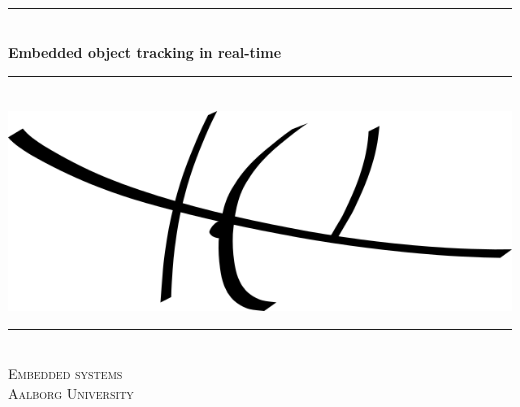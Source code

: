 \begin{titlingpage}

  \centering
  \rule{\linewidth}{0.2 mm} \\[0.5 cm]
  { \huge \bfseries Embedded object tracking in real-time}\\
  \rule{\linewidth}{0.2 mm} \\[2 cm]
  \includegraphics[scale=0.70]{images/hclLogo.png}\\[2 cm]
  \rule{\linewidth}{0.2 mm} \\[0.3 cm]
  \textsc{\LARGE Embedded systems} \\[0.5 cm]
  \textsc{\large Aalborg University}\\[0.5 cm]
  {\Large \groupnumber}\\[0.5 cm]

\end{titlingpage}
